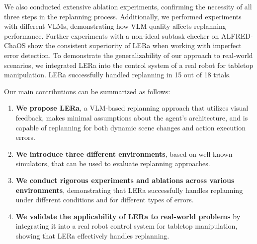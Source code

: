 \documentclass[letterpaper, 10 pt, conference]{ieeeconf}  %
\begin{document}
We also conducted extensive ablation experiments, confirming the necessity of all three steps in the replanning process. Additionally, we performed experiments with different VLMs, demonstrating how VLM quality affects replanning performance. Further experiments with a non-ideal subtask checker on ALFRED-ChaOS show the consistent superiority of LERa when working with imperfect error detection. To demonstrate the generalizability of our approach to real-world scenarios, we integrated LERa into the control system of a real robot for tabletop manipulation. LERa successfully handled replanning in 15 out of 18 trials.

Our main contributions can be summarized as follows:
\begin{enumerate}
    \item \textbf{We propose LERa}, a VLM-based replanning approach that utilizes visual feedback, makes minimal assumptions about the agent's architecture, and is capable of replanning for both dynamic scene changes and action execution errors.
    \item \textbf{We introduce three different environments}, based on well-known simulators, that can be used to evaluate replanning approaches.
    \item \textbf{We conduct rigorous experiments and ablations across various environments}, demonstrating that LERa successfully handles replanning under different conditions and for different types of errors.
    \item \textbf{We validate the applicability of LERa to real-world problems} by integrating it into a real robot control system for tabletop manipulation, showing that LERa effectively handles replanning.
\end{enumerate}
\end{document}
